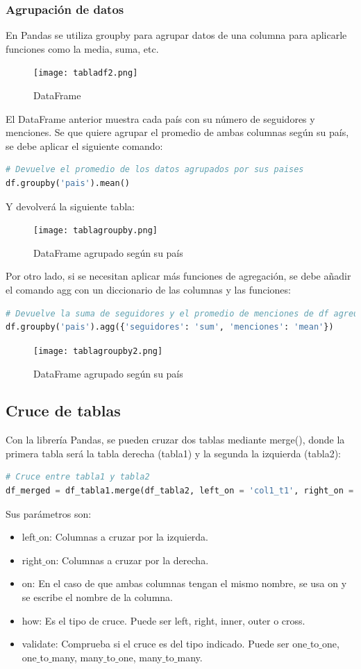 \documentclass[a4paper, 12pt]{book}
\begin{document}
\subsubsection{Agrupación de datos}
En Pandas se utiliza groupby para agrupar datos de una columna para aplicarle funciones como la media, suma, etc.
\begin{figure}[H] 
	\centering 
	\texttt{[image: tabladf2.png]}
	\caption{DataFrame}
\end{figure}
El DataFrame anterior muestra cada país con su número de seguidores y menciones. Se que quiere agrupar el promedio de ambas columnas según su país, se debe aplicar el siguiente comando:
\begin{lstlisting}[language=Python]
# Devuelve el promedio de los datos agrupados por sus paises
df.groupby('pais').mean()
\end{lstlisting}
Y devolverá la siguiente tabla:
\begin{figure}[H] 
	\centering 
	\texttt{[image: tablagroupby.png]}
	\caption{DataFrame agrupado según su país}
\end{figure}
Por otro lado, si se necesitan aplicar más funciones de agregación, se debe añadir el comando agg con un diccionario de las columnas y las funciones:
\begin{lstlisting}[language=Python]
# Devuelve la suma de seguidores y el promedio de menciones de df agreupados por pais
df.groupby('pais').agg({'seguidores': 'sum', 'menciones': 'mean'})
\end{lstlisting}

\begin{figure}[H] 
	\centering 
	\texttt{[image: tablagroupby2.png]}
	\caption{DataFrame agrupado según su país}
\end{figure}

\subsection{Cruce de tablas}
Con la librería Pandas, se pueden cruzar dos tablas mediante merge(), donde la primera tabla será la tabla derecha (tabla1) y la segunda la izquierda (tabla2):
\begin{lstlisting}[language=Python]
# Cruce entre tabla1 y tabla2
df_merged = df_tabla1.merge(df_tabla2, left_on = 'col1_t1', right_on = 'col1_t2', how='inner', validate = 'many_to_one')
\end{lstlisting}
Sus parámetros son:
\begin{itemize}
	\item left$\_$on: Columnas a cruzar por la izquierda.
	\item right$\_$on: Columnas a cruzar por la derecha.
	\item on: En el caso de que ambas columnas tengan el mismo nombre, se usa on y se escribe el nombre de la columna.
	\item how: Es el tipo de cruce. Puede ser left, right, inner, outer o cross.
	\item validate: Comprueba si el cruce es del tipo indicado. Puede ser one$\_$to$\_$one, one$\_$to$\_$many, many$\_$to$\_$one, many$\_$to$\_$many.
\end{itemize}
\end{document}
